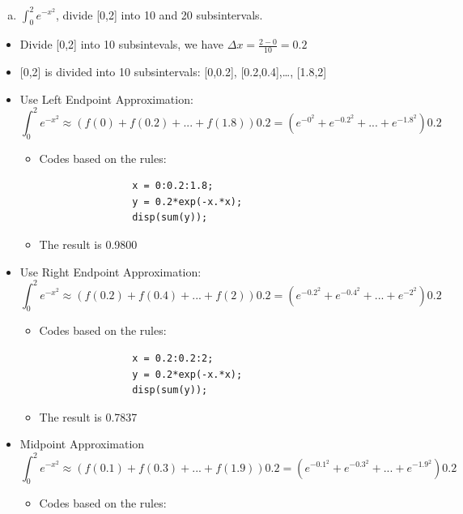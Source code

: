 \documentclass[12pt,en,a4paper]{article}
\begin{document}
	\begin{enumerate}[b)]
		\item \(\int_{0}^{2}e^{-x^{2}}\), divide [0,2] into 10 and 20 subsintervals.
	\end{enumerate}
	\begin{itemize}
		\item Divide [0,2] into 10 subsintevals, we have \(\Delta x=\frac{2-0}{10}=0.2\)
		\item {[0,2]} is divided into 10 subsintervals: [0,0.2], [0.2,0.4],…, [1.8,2]
		\item Use Left Endpoint Approximation:
		\[\int_{0}^{2}e^{-x^{2}}\approx (f(0)+f(0.2)+...+f(1.8))0.2=(e^{-0^{2}}+e^{-0.2^{2}}+...+e^{-1.8^{2}})0.2\]
		\begin{itemize}
			\item Codes based on the rules:\\
			\begin{mdframed}[hidealllines=true,backgroundcolor=magenta!10]
				\begin{lstlisting}
				x = 0:0.2:1.8;
				y = 0.2*exp(-x.*x);
				disp(sum(y));
				\end{lstlisting}
			\end{mdframed}
			\item The result is 0.9800
		\end{itemize}
		\item Use Right Endpoint Approximation:
		\[\int_{0}^{2}e^{-x^{2}}\approx (f(0.2)+f(0.4)+...+f(2))0.2=(e^{-0.2^{2}}+e^{-0.4^{2}}+...+e^{-2^{2}})0.2\]
		\begin{itemize}
			\item Codes based on the rules:\\
			\begin{mdframed}[hidealllines=true,backgroundcolor=magenta!10]
				\begin{lstlisting}
				x = 0.2:0.2:2;
				y = 0.2*exp(-x.*x);
				disp(sum(y));
				\end{lstlisting}
			\end{mdframed}
			\item The result is 0.7837
		\end{itemize}
		\item Midpoint Approximation
		\[\int_{0}^{2}e^{-x^{2}}\approx (f(0.1)+f(0.3)+...+f(1.9))0.2=(e^{-0.1^{2}}+e^{-0.3^{2}}+...+e^{-1.9^{2}})0.2\]
		\begin{itemize}
			\item Codes based on the rules:\\
			\begin{mdframed}[hidealllines=true,backgroundcolor=magenta!10]

\end{mdframed}
\end{itemize}
\end{itemize}
\end{document}
